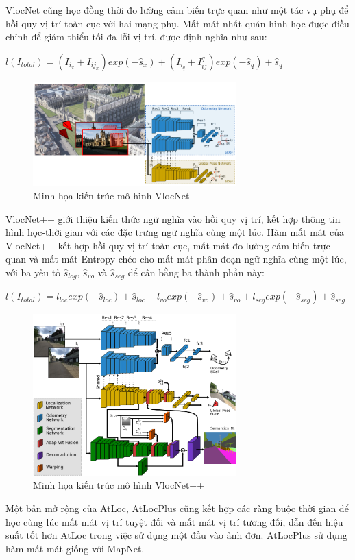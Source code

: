 VlocNet \cite{valada2018deep} cũng học đồng thời đo lường cảm biến trực quan như một tác vụ phụ để hồi quy vị trí toàn cục với hai mạng phụ. Mất mát nhất quán hình học được điều chỉnh để giảm thiểu tối đa lỗi vị trí, được định nghĩa như sau:
\begin{center}
$l(I_{total}) = (I_{i_x} + I_{ij_x})exp(-\hat{s}_x) + (I_{i_q} + I^{q}_{ij})exp(-\hat{s}_q)+ \hat{s}_q$
\end{center}
\begin{figure}[H]
    \centering
    \includegraphics[width=0.7\textwidth]{pics/Chapter2/vlocnet.png}
    \caption{Minh họa kiến trúc mô hình VlocNet \cite{valada2018deep}}
\end{figure}
VlocNet++ \cite{Radwan_2018} giới thiệu kiến thức ngữ nghĩa vào hồi quy vị trí, kết hợp thông tin hình học-thời gian với các đặc trưng ngữ nghĩa cùng một lúc. Hàm mất mát của VlocNet++ kết hợp hồi quy vị trí toàn cục, mất mát đo lường cảm biến trực quan và mất mát Entropy chéo cho mất mát phân đoạn ngữ nghĩa cùng một lúc, với ba yếu tố $\hat{s}_{log}$, $\hat{s}_{vo}$ và $\hat{s}_{seg}$ để cân bằng ba thành phần này:
\begin{center}
$ l(I_{total}) = l_{loc}exp(-\hat{s}_{loc})+ \hat{s}_{loc}+l_{vo}exp(-\hat{s}_{vo})+ \hat{s}_{vo}+l_{seg}exp(-\hat{s}_{seg})+ \hat{s}_{seg}$
\end{center}
\begin{figure}[H]
    \centering
    \includegraphics[width=0.7\textwidth]{pics/Chapter2/vlocnetplus.png}
    \caption{Minh họa kiến trúc mô hình VlocNet++ \cite{Radwan_2018}}
\end{figure}
Một bản mở rộng của AtLoc, AtLocPlus \cite{wang2019atloc} cũng kết hợp các ràng buộc thời gian để học cùng lúc mất mát vị trí tuyệt đối và mất mát vị trí tương đối, dẫn đến hiệu suất tốt hơn AtLoc trong việc sử dụng một đầu vào ảnh đơn. AtLocPlus sử dụng hàm mất mát giống với MapNet.

